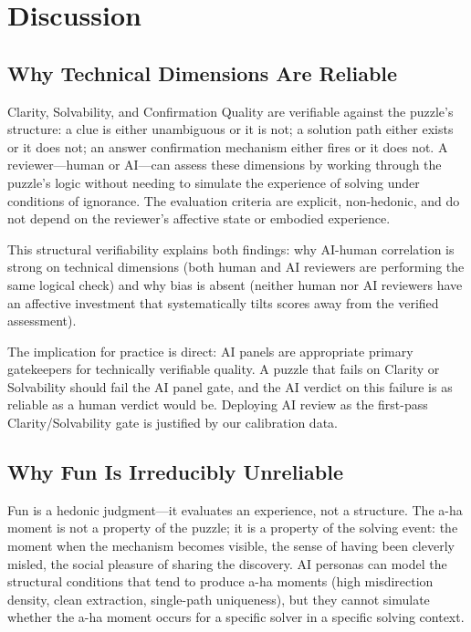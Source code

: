 \section{Discussion}
\label{sec:discussion}

\subsection{Why Technical Dimensions Are Reliable}

Clarity, Solvability, and Confirmation Quality are verifiable against the puzzle's structure: a clue is either unambiguous or it is not; a solution path either exists or it does not; an answer confirmation mechanism either fires or it does not. A reviewer---human or AI---can assess these dimensions by working through the puzzle's logic without needing to simulate the experience of solving under conditions of ignorance. The evaluation criteria are explicit, non-hedonic, and do not depend on the reviewer's affective state or embodied experience.

This structural verifiability explains both findings: why AI-human correlation is strong on technical dimensions (both human and AI reviewers are performing the same logical check) and why bias is absent (neither human nor AI reviewers have an affective investment that systematically tilts scores away from the verified assessment).

The implication for practice is direct: AI panels are appropriate primary gatekeepers for technically verifiable quality. A puzzle that fails on Clarity or Solvability should fail the AI panel gate, and the AI verdict on this failure is as reliable as a human verdict would be. Deploying AI review as the first-pass Clarity/Solvability gate is justified by our calibration data.

\subsection{Why Fun Is Irreducibly Unreliable}

Fun is a hedonic judgment---it evaluates an experience, not a structure. The a-ha moment is not a property of the puzzle; it is a property of the solving event: the moment when the mechanism becomes visible, the sense of having been cleverly misled, the social pleasure of sharing the discovery. AI personas can model the structural conditions that tend to produce a-ha moments (high misdirection density, clean extraction, single-path uniqueness), but they cannot simulate whether the a-ha moment occurs for a specific solver in a specific solving context.

